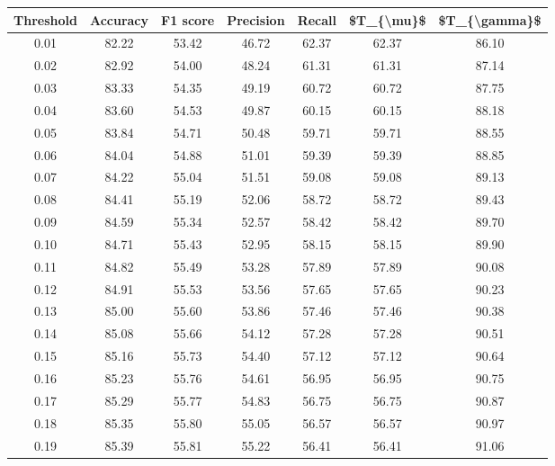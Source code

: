 \begin{tabular}{|c|c|c|c|c|c|c|}
\hline
 Threshold &  Accuracy &  F1 score &  Precision &  Recall &  \$T\_\{\textbackslash mu\}\$ &  \$T\_\{\textbackslash gamma\}\$ \\
\hline
      0.01 &     82.22 &     53.42 &      46.72 &   62.37 &      62.37 &         86.10 \\
      0.02 &     82.92 &     54.00 &      48.24 &   61.31 &      61.31 &         87.14 \\
      0.03 &     83.33 &     54.35 &      49.19 &   60.72 &      60.72 &         87.75 \\
      0.04 &     83.60 &     54.53 &      49.87 &   60.15 &      60.15 &         88.18 \\
      0.05 &     83.84 &     54.71 &      50.48 &   59.71 &      59.71 &         88.55 \\
      0.06 &     84.04 &     54.88 &      51.01 &   59.39 &      59.39 &         88.85 \\
      0.07 &     84.22 &     55.04 &      51.51 &   59.08 &      59.08 &         89.13 \\
      0.08 &     84.41 &     55.19 &      52.06 &   58.72 &      58.72 &         89.43 \\
      0.09 &     84.59 &     55.34 &      52.57 &   58.42 &      58.42 &         89.70 \\
      0.10 &     84.71 &     55.43 &      52.95 &   58.15 &      58.15 &         89.90 \\
      0.11 &     84.82 &     55.49 &      53.28 &   57.89 &      57.89 &         90.08 \\
      0.12 &     84.91 &     55.53 &      53.56 &   57.65 &      57.65 &         90.23 \\
      0.13 &     85.00 &     55.60 &      53.86 &   57.46 &      57.46 &         90.38 \\
      0.14 &     85.08 &     55.66 &      54.12 &   57.28 &      57.28 &         90.51 \\
      0.15 &     85.16 &     55.73 &      54.40 &   57.12 &      57.12 &         90.64 \\
      0.16 &     85.23 &     55.76 &      54.61 &   56.95 &      56.95 &         90.75 \\
      0.17 &     85.29 &     55.77 &      54.83 &   56.75 &      56.75 &         90.87 \\
      0.18 &     85.35 &     55.80 &      55.05 &   56.57 &      56.57 &         90.97 \\
      0.19 &     85.39 &     55.81 &      55.22 &   56.41 &      56.41 &         91.06 \\

\end{tabular}
